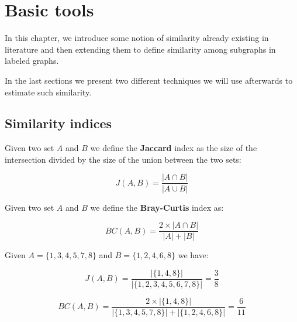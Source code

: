 
\chapter{Basic tools}

In this chapter, we introduce some notion of similarity already existing in literature and then extending them to define similarity among subgraphs in labeled graphs.

In the last sections we present two different techniques we will use afterwards to estimate such similarity.

\section{Similarity indices}

\begin{definizione}\label{def:jaccard}
	Given two set $A$ and $B$ we define the \textbf{Jaccard} index as the size of the intersection divided by the size of the union between the two sets:
	
	\begin{equation}
	J(A,B) = \frac{|A \cap B|}{|A \cup B|}
	\end{equation}
	
\end{definizione}

\begin{definizione}\label{def:bray}
	Given two set $A$ and $B$ we define the \textbf{Bray-Curtis} index as:
	
	\begin{equation}
	BC(A,B) = \frac{2 \times |A \cap B|}{|A| + |B|}
	\end{equation}
	
\end{definizione}

\begin{esempio}
	Given $A = \{1, 3, 4, 5, 7, 8\}$ and $B = \{1, 2, 4, 6, 8\}$ we have:
	
	\begin{equation*}
	J(A,B) = \frac{|\{1, 4, 8\}|}{|\{1, 2, 3, 4, 5, 6, 7, 8\}|} = \frac{3}{8} 
	\end{equation*}
	
	\begin{equation*}
	BC(A,B) = \frac{2 \times |\{1, 4, 8\}|}{|\{1, 3, 4, 5, 7, 8\}| + |\{1, 2, 4, 6, 8\}|} = \frac{6}{11} 
	\end{equation*}
\end{esempio}

